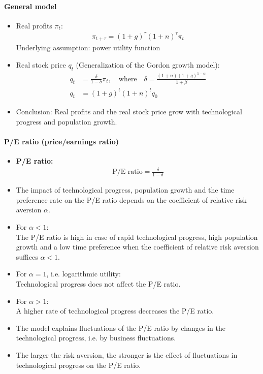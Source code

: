 \documentclass[a4paper,landscape,7pt,fleqn]{scrartcl}
\renewcommand{\emph}[1]{\textbf{#1}}
\begin{document}
\begin{multicols*}{3}
\paragraph{General model}

\begin{itemize}
\item Real profits $\pi_t$:
\begin{align*}
\pi_{t+\tau} = (1+g)^\tau (1+n)^\tau \pi_t
\end{align*}
Underlying assumption: power utility function
\item Real stock price $q_t$ (Generalization of the Gordon growth model):
\begin{align*}
q_t &= \frac{\delta}{1-\delta} \pi_t, \quad \text{where} \quad \delta = \frac{(1+n)(1+g)^{1-\alpha}}{1+\beta} \\
q_t &= (1+g)^t (1+n)^t q_0
\end{align*}
\item Conclusion: Real profits and the real stock price grow with technological progress and population growth.
\end{itemize}

\paragraph{P/E ratio (price/earnings ratio)}

\begin{itemize}
\item \emph{P/E ratio:}
\begin{align*}
\text{P/E ratio} = \frac{\delta}{1-\delta}
\end{align*}
\item The impact of technological progress, population growth and the time preference rate on the P/E ratio depends on the coefficient of relative risk aversion $\alpha$.
\item For $\alpha < 1$: \\
The P/E ratio is high in case of rapid technological progress, high population growth and a low time preference when the coefficient of relative risk aversion suffices $\alpha < 1$.
\item For $\alpha = 1$, i.e. logarithmic utility: \\
Technological progress does not affect the P/E ratio.
\item For $\alpha > 1$: \\
A higher rate of technological progress decreases the P/E ratio.
\item The model explains fluctuations of the P/E ratio by changes in the technological progress, i.e. by business fluctuations.
\item The larger the risk aversion, the stronger is the effect of fluctuations in technological progress on the P/E ratio.
\end{itemize}


\end{multicols*}
\end{document}

